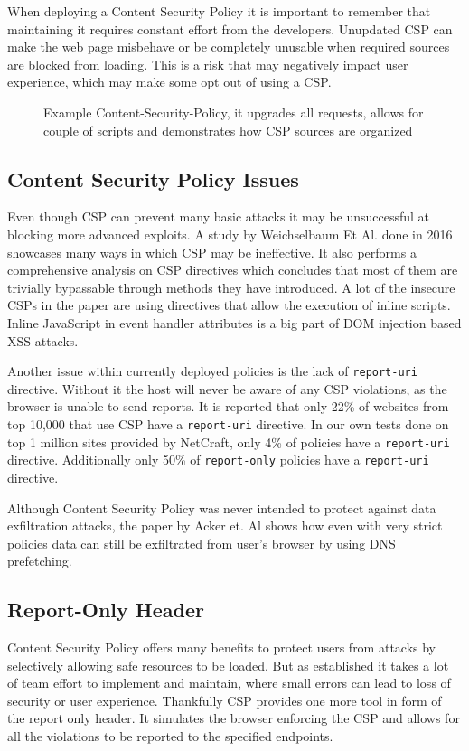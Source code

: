When deploying a Content Security Policy it is important to remember that maintaining it requires constant effort from the developers.
Unupdated CSP can make the web page misbehave or be completely unusable when required sources are blocked from loading.
This is a risk that may negatively impact user experience, which may make some opt out of using a CSP.

\begin{figure}[h]
	
	\caption{Example Content-Security-Policy, it upgrades all requests, allows for couple of scripts and demonstrates how CSP sources are organized}
\end{figure}


\subsection{Content Security Policy Issues}
Even though CSP can prevent many basic attacks it may be unsuccessful at blocking more advanced exploits.
A study by Weichselbaum Et Al. done in 2016 showcases many ways in which CSP may be ineffective. \cite{weichselbaum2016csp}
It also performs a comprehensive analysis on CSP directives which concludes that most of them are trivially bypassable through methods they have introduced.
A lot of the insecure CSPs in the paper are using directives that allow the execution of inline scripts.
Inline JavaScript in event handler attributes is a big part of DOM injection based XSS attacks.

Another issue within currently deployed policies is the lack of \texttt{report-uri} directive.
Without it the host will never be aware of any CSP violations, as the browser is unable to send reports.
It is reported that only 22\% of websites from top 10,000 that use CSP have a \texttt{report-uri} directive.
In our own tests done on top 1 million sites provided by NetCraft, only 4\% of policies have a \texttt{report-uri} directive.
Additionally only 50\% of \texttt{report-only} policies have a \texttt{report-uri} directive.

Although Content Security Policy was never intended to protect against data exfiltration attacks, 
the paper by Acker et. Al shows how even with very strict policies data can still be exfiltrated from user's browser by using DNS prefetching.


\subsection{Report-Only Header}
Content Security Policy offers many benefits to protect users from attacks by selectively allowing safe resources to be loaded.
But as established it takes a lot of team effort to implement and maintain, where small errors can lead to loss of security or user experience.
Thankfully CSP provides one more tool in form of the report only header.
It simulates the browser enforcing the CSP and allows for all the violations to be reported to the specified endpoints.

